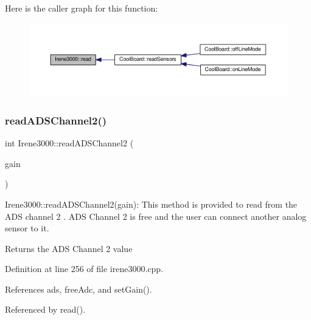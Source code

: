 Here is the caller graph for this function\+:
\nopagebreak
\begin{figure}[H]
\begin{center}
\leavevmode
\includegraphics[width=350pt]{classIrene3000_a852a170feea994ea1df01c6b245b5d9a_icgraph}
\end{center}
\end{figure}
\mbox{\label{classIrene3000_ae73bd2ed14a199a7e83f4d6458476a7c}} 
\subsubsection{\texorpdfstring{read\+A\+D\+S\+Channel2()}{readADSChannel2()}}
{\footnotesize\ttfamily int Irene3000\+::read\+A\+D\+S\+Channel2 (\begin{DoxyParamCaption}\item[{ads\+Gain\+\_\+t}]{gain }\end{DoxyParamCaption})}

Irene3000\+::read\+A\+D\+S\+Channel2(gain)\+: This method is provided to read from the A\+DS channel 2 . A\+DS Channel 2 is free and the user can connect another analog sensor to it.

\begin{DoxyReturn}{Returns}
the A\+DS Channel 2 value 
\end{DoxyReturn}


Definition at line 256 of file irene3000.\+cpp.



References ads, free\+Adc, and set\+Gain().



Referenced by read().


